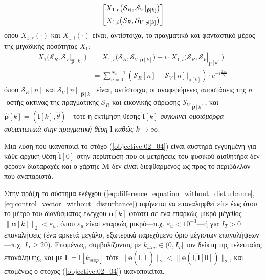 \begin{bw_box}
\begin{theorem}
\begin{align}
\begin{bmatrix}
      X_{1,r}\big(\mathcal{S}_R, \mathcal{S}_V|_{\bm{\hat{p}}[k]}\big) \vspace{0.2cm} \\
      X_{1,i}\big(\mathcal{S}_R, \mathcal{S}_V|_{\bm{\hat{p}}[k]}\big)
    \end{bmatrix}
    \label{eq:control_vector_without_disturbance}
  \end{align}
  όπου $X_{1,r}(\cdot)$ και $X_{1,i}(\cdot)$ είναι, αντίστοιχα, το πραγματικό
  και φανταστικό μέρος της μιγαδικής ποσότητας $X_1$:
  \begin{align}
    X_1\big(\mathcal{S}_R, \mathcal{S}_V|_{\bm{\hat{p}}[k]}\big) &= X_{1,r}\big(\mathcal{S}_R, \mathcal{S}_V|_{\bm{\hat{p}}[k]}\big)
      + i \cdot X_{1,i}\big(\mathcal{S}_R, \mathcal{S}_V|_{\bm{\hat{p}}[k]}\big) \nonumber \\
      &= \sum\limits_{n=0}^{N_s-1}(\mathcal{S}_R[n] - \mathcal{S}_V[n]|_{\bm{\hat{p}}[k]}) \cdot e^{-i \frac{2 \pi n}{N_s}} \label{eq:X1}
  \end{align}
  όπου $\mathcal{S}_R[n]$ και $\mathcal{S}_V[n]|_{\bm{\hat{p}}[k]}$ είναι,
  αντίστοιχα, οι αναφερόμενες αποστάσεις της $n$-οστής ακτίνας της πραγματικής
  $\mathcal{S}_R$ και εικονικής σάρωσης $\mathcal{S}_V|_{\bm{\hat{p}}[k]}$, και
  $\hat{\bm{p}}[k] = (\hat{\bm{l}}[k], \hat{\theta})$---τότε η εκτίμηση θέσης
  $\hat{\bm{l}}[k]$ \textit{συγκλίνει ομοιόμορφα ασυμπτωτικά στην πραγματική
  θέση} $\bm{l}$ \textit{καθώς} $k \rightarrow \infty$.
\end{theorem}
\end{bw_box}

\begin{corollary}
  Μια λύση που ικανοποιεί το στόχο (\ref{objective:02_04}) είναι αυστηρά
  εγγυημένη για κάθε αρχική θέση $\hat{\bm{l}}[0]$ στην περίπτωση που οι
  μετρήσεις του φυσικού αισθητήρα δεν φέρουν διαταραχές και ο χάρτης $\bm{M}$
  δεν είναι διεφθαρμένος ως προς το περιβάλλον που αναπαριστά.
\end{corollary}

Στην πράξη το σύστημα ελέγχου
(\ref{eq:difference_equation_without_disturbance},
\ref{eq:control_vector_without_disturbance}) αφήνεται να επαναληφθεί είτε
έως ότου το μέτρο του διανύσματος ελέγχου $\bm{u}[k]$ φτάσει σε ένα επαρκώς
μικρό μέγεθος $\|\bm{u}[k]\|_2 < \varepsilon_u$, όπου $\varepsilon_u$ είναι
επαρκώς μικρό---π.χ. $\varepsilon_u < 10^{-3}$---ή για $I_T > 0$ επαναλήψεις
(ένα αρκετά μεγάλο, εξωτερικά παρεχόμενο όριο μέγιστων επαναλήψεων---π.χ. $I_T
\geq 20$). Επομένως, συμβολίζοντας με $k_{stop} \in (0, I_T]$ τον δείκτη
της τελευταίας επανάληψης, και με
$\hat{\bm{l}}^{\prime} = \hat{\bm{l}}[k_{stop}]$ τότε
$\|\bm{e}(\bm{l}, \hat{\bm{l}}^{\prime})\|_2 < \|\bm{e}(\bm{l}, \hat{\bm{l}}[0])\|_2$,
και επομένως ο στόχος (\ref{objective:02_04}) ικανοποιείται.

